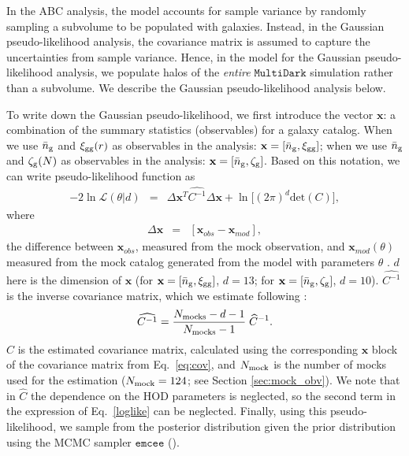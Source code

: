 In the ABC analysis, the model accounts for sample variance by randomly sampling a subvolume to be 
populated with galaxies. 
Instead, in the Gaussian pseudo-likelihood analysis, the covariance matrix is assumed to capture the
uncertainties from sample variance. Hence, in the model for the Gaussian pseudo-likelihood analysis, 
we populate halos of the {\em entire} $\mathtt{MultiDark}$ simulation rather than a subvolume.
We describe the Gaussian pseudo-likelihood analysis below.

To write down the Gaussian pseudo-likelihood, we first introduce the vector $\mathbf{x}$: 
a combination of the summary statistics (observables) for a galaxy catalog. 
When we use $\bar{n}_{\mathrm{g}}$ and $\xi_{\mathrm{gg}}(r)$ as observables in the analysis: $\mathbf{x} = [\bar{n}_{\mathrm{g}} , \xi_{\mathrm{gg}}]$;
when we use $\bar{n}_{\mathrm{g}}$ and $\mathcal{\zeta}_{\rm g}(N)$ as observables in the analysis: $\mathbf{x} = [\bar{n}_{\mathrm{g}} , \mathcal{\zeta}_{\rm g}]$.
Based on this notation, we can write pseudo-likelihood function as 
\begin{eqnarray}
-2 \ln \mathcal{L}(\theta | d) &=& \Delta \mathbf{x}^{T}\widehat{C^{-1}}\Delta \mathbf{x} + \ln\Big[(2\pi)^{d}\mathrm{det}(C)\Big], \label{loglike}
\end{eqnarray}
where 
\begin{eqnarray}
\Delta \mathbf{x} &=& [\mathbf{x}_{obs} -\mathbf{x}_{mod}], 
\end{eqnarray}
the difference between $\mathbf{x}_{obs}$, measured from the mock observation, 
and $\mathbf{x}_{mod}(\mathbb{\theta})$ measured from the mock catalog generated 
from the model with parameters $\theta$ .
$d$ here is the dimension of $\mathbf{x}$ (for $\mathbf{x} = [\bar{n}_{\mathrm{g}}, \xi_{\mathrm{gg}}]$, $d = 13$; 
for $\mathbf{x} = [\bar{n}_{\mathrm{g}}, \mathcal{\zeta}_{\rm g}]$, $d = 10$).  
$\widehat{C^{-1}}$ is the inverse covariance matrix, which we estimate following \cite{hartlap2007}:
\begin{eqnarray}
\widehat{C^{-1}} = \frac{N_{\rm mocks}-d - 1}{N_{\rm mocks} -1} \; \widehat{C}^{-1}.
\end{eqnarray}
$\widehat{C}$ is the estimated covariance matrix, calculated using the corresponding 
$\mathbf{x}$ block of the covariance matrix from Eq.~\ref{eq:cov}, and $N_{\rm mock}$ 
is the number of mocks used for the estimation ($N_{\rm mock} = 124$; see Section \ref{sec:mock_obv}).
We note that in $\widehat{C}$ the dependence on the HOD parameters is neglected, 
so the second term in the expression of Eq.~\ref{loglike} can be neglected. 
Finally, using this pseudo-likelihood, we sample from the posterior distribution 
given the prior distribution using the MCMC sampler $\mathtt{emcee}$ (\citealt{emcee}). 


